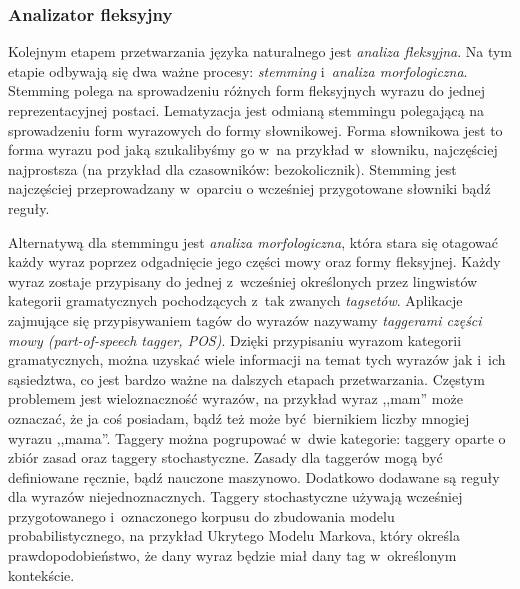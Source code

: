 \documentclass[a4paper, twoside, openright, 12pt]{report}
\begin{document}
            \subsubsection{Analizator fleksyjny}
                Kolejnym etapem przetwarzania języka naturalnego jest \emph{analiza fleksyjna}. Na tym etapie odbywają się dwa
                ważne procesy: \emph{stemming} i~\emph{analiza morfologiczna}. Stemming polega na sprowadzeniu różnych form fleksyjnych wyrazu do jednej
                reprezentacyjnej postaci. Lematyzacja jest odmianą stemmingu polegającą na sprowadzeniu form wyrazowych do
                formy słownikowej.
                Forma słownikowa jest to forma wyrazu pod jaką szukalibyśmy go w~na przykład w~słowniku, najczęściej najprostsza
                (na przykład dla czasowników: bezokolicznik). Stemming jest najczęściej przeprowadzany w~oparciu o wcześniej
                przygotowane słowniki bądź reguły.

                Alternatywą dla stemmingu jest \emph{analiza morfologiczna}, która stara się otagować każdy wyraz poprzez odgadnięcie
                jego części mowy oraz formy fleksyjnej. Każdy wyraz zostaje przypisany do jednej z~wcześniej określonych
                przez lingwistów kategorii gramatycznych pochodzących z~tak zwanych \emph{tagsetów}. Aplikacje zajmujące
                się przypisywaniem tagów do wyrazów nazywamy \emph{taggerami części mowy (part-of-speech tagger, POS)}. Dzięki przypisaniu
                wyrazom kategorii gramatycznych, można uzyskać wiele informacji na temat tych wyrazów jak i~ich sąsiedztwa,
                co jest bardzo ważne na dalszych etapach przetwarzania. Częstym problemem jest wieloznaczność wyrazów, na przykład
                wyraz ,,mam'' może oznaczać, że ja coś posiadam, bądź też może być biernikiem liczby mnogiej wyrazu ,,mama''.
                Taggery można pogrupować w~dwie kategorie: taggery oparte o zbiór zasad oraz taggery stochastyczne. Zasady
                dla taggerów mogą być definiowane ręcznie, bądź nauczone maszynowo. Dodatkowo dodawane są reguły dla wyrazów
                niejednoznacznych. Taggery stochastyczne używają wcześniej przygotowanego i~oznaczonego korpusu do zbudowania
                modelu probabilistycznego, na przykład Ukrytego Modelu Markova, który określa prawdopodobieństwo, że dany
                wyraz będzie miał dany tag w~określonym kontekście\cite{SPEECHANDLANGUAGEPROCESSING}.
\end{document}
